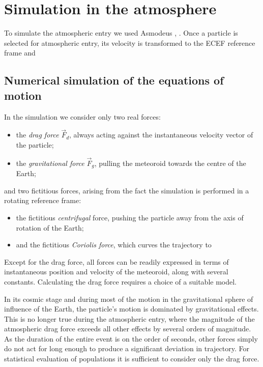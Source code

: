 \section{Simulation in the atmosphere} \label{aa}
    To simulate the atmospheric entry we used Asmodeus \citep{balaz-thesis}, \citep{balaz+2020}.
    Once a particle is selected for atmospheric entry, its velocity is transformed to the ECEF reference frame
    and 

    \subsection{Numerical simulation of the equations of motion}

        In the simulation we consider only two real forces:
        \begin{itemize}
            \item the \emph{drag force} $\vec{F}_{d}$, always acting against the instantaneous velocity vector of the particle;
            \item the \emph{gravitational force} $\vec{F}_{g}$, pulling the meteoroid towards the centre of the Earth;
        \end{itemize}
        and two fictitious forces, arising from the fact the simulation is performed in a rotating reference frame:
        \begin{itemize}
            \item the fictitious \emph{centrifugal} force, pushing the particle away from the axis of rotation of the Earth;
            \item and the fictitious \emph{Coriolis force}, which curves the trajectory to
        \end{itemize}

        Except for the drag force, all forces can be readily expressed in terms of instantaneous position and velocity of the meteoroid,
        along with several constants.
        Calculating the drag force requires a choice of a suitable model.

        In its cosmic stage and during most of the motion in the gravitational sphere of influence of the Earth,
        the particle's motion is dominated by gravitational effects. This is no longer true during the atmospheric entry,
        where the magnitude of the atmospheric drag force exceeds all other effects by several orders of magnitude.
        As the duration of the entire event is on the order of seconds, other forces simply do not act for long enough
        to produce a significant deviation in trajectory. For statistical evaluation of populations it is sufficient
        to consider only the drag force.

